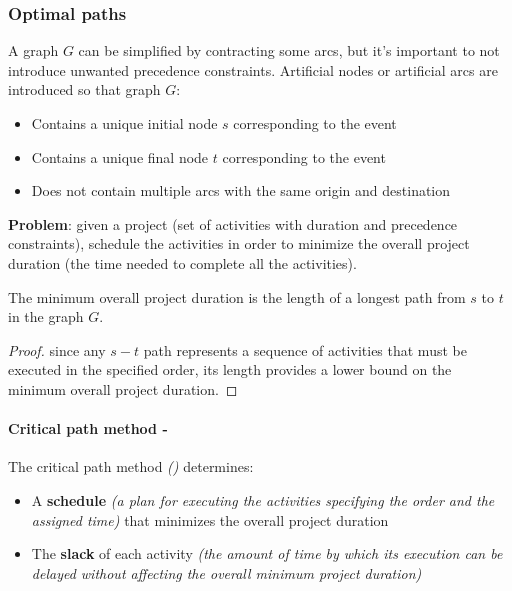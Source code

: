 \documentclass[english]{article}
\begin{document}
\subsubsection{Optimal paths}

A graph \(G\) can be simplified by contracting some arcs, but it's important to not introduce unwanted precedence constraints.
Artificial nodes or artificial arcs are introduced so that graph \(G\):

\begin{itemize}
  \item Contains a unique initial node \(s\) corresponding to the event 
  \item Contains a unique final node \(t\) corresponding to the event 
  \item Does not contain multiple arcs with the same origin and destination
\end{itemize}

\bigskip
\textbf{Problem}:
given a project (set of activities with duration and precedence constraints), schedule the activities in order to minimize the overall project duration (the time needed to complete all the activities).

\bigskip
\begin{property}
  The minimum overall project duration is the length of a longest path from \(s\) to \(t\) in the graph \(G\).
\end{property}

\begin{proof}
  since any \(s-t\) path represents a sequence of activities that must be executed in the specified order, its length provides a lower bound on the minimum overall project duration.
\end{proof}

\paragraph{Critical path method - \CPM}

The critical path method \textit{(\CPM) } determines:

\begin{itemize}
  \item A \textbf{schedule} \textit{(a plan for executing the activities specifying the order and the assigned time)} that minimizes the overall project duration
  \item The \textbf{slack} of each activity \textit{(the amount of time by which its execution can be delayed without affecting the overall minimum project duration)}
\end{itemize}
\end{document}
